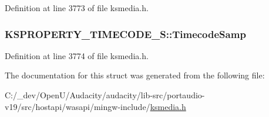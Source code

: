 Definition at line 3773 of file ksmedia.\+h.

\subsubsection[{\texorpdfstring{Timecode\+Samp}{TimecodeSamp}}]{ K\+S\+P\+R\+O\+P\+E\+R\+T\+Y\+\_\+\+T\+I\+M\+E\+C\+O\+D\+E\+\_\+\+S\+::\+Timecode\+Samp}\hypertarget{struct_k_s_p_r_o_p_e_r_t_y___t_i_m_e_c_o_d_e___s_a3ba1bf1fbdf129c6498115a6ebf45695}{}\label{struct_k_s_p_r_o_p_e_r_t_y___t_i_m_e_c_o_d_e___s_a3ba1bf1fbdf129c6498115a6ebf45695}


Definition at line 3774 of file ksmedia.\+h.



The documentation for this struct was generated from the following file\+:\begin{DoxyCompactItemize}
\item 
C\+:/\+\_\+dev/\+Open\+U/\+Audacity/audacity/lib-\/src/portaudio-\/v19/src/hostapi/wasapi/mingw-\/include/\hyperlink{ksmedia_8h}{ksmedia.\+h}\end{DoxyCompactItemize}
